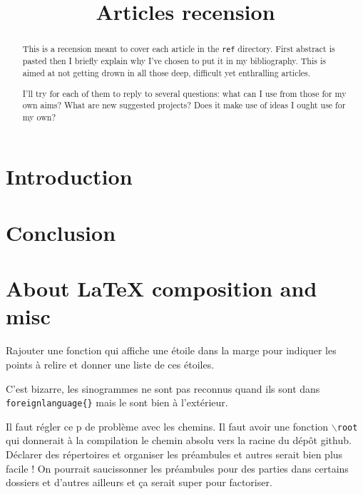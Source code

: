 \documentclass[12pt,onecolumn]{article} %
\title{Articles recension}
\author{}
\begin{document}
\maketitle
{}
\begin{abstract}
\par This is a recension meant to cover each article in the \texttt{ref} directory. First abstract is pasted then I briefly explain why I've chosen to put it in my bibliography. This is aimed at not getting drown in all those deep, difficult yet enthralling articles.\par I'll try for each of them to reply to several questions: what can I use from those for my own aims? What are new suggested projects? Does it make use of ideas I ought use for my own?
\end{abstract}

\tableofcontents
\cleardoublepage

\section*{Introduction}

\section{}


\section*{Conclusion}

\section*{About \LaTeX{} composition and misc}
Rajouter une fonction qui affiche une étoile dans la marge pour indiquer les points à relire et donner une liste de ces étoiles.

C'est bizarre, les sinogrammes ne sont pas reconnus quand ils sont dans \texttt{foreignlanguage\{\}} mais le sont bien à l'extérieur.

Il faut régler ce p\*\*\* de problème avec les chemins. Il faut avoir une fonction \texttt{$\backslash$root} qui donnerait à la compilation le chemin absolu vers la racine du dépôt github. Déclarer des répertoires et organiser les préambules et autres serait bien plus facile ! On pourrait saucissonner les préambules pour des parties dans certains dossiers et d'autres ailleurs et ça serait super pour factoriser.


\end{document}
